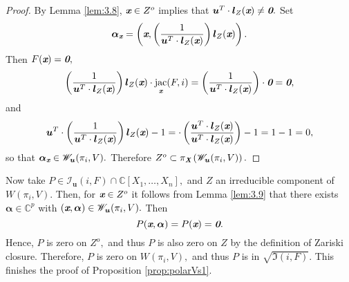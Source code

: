 \documentclass[a4paper]{article}
\def\bz{\textit{\textbf{0}}}
\def\Xb{\textit{\textbf{X}}}
\def\ub{{\bm u}}
\def\lb{{\bm l}}
\def\ax{\bm \alpha_{\xb}}
\def\xb{\textit{\textbf{x}}}
\DeclareMathOperator{\jac}{jac}
\def\C{\mathbb{C}}
\def\Wi{W(\pi_i,V)}
\def\Iir{\sqrt{\mathfrak{I}(i,F)}}
\def\ji{\jac_{\xb}(F,i)}
\def\Iil{\mathscr{I}_{\ub}(i,F)}
\def\Wil{\mathscr{W}_{\ub}(\pi_i,V)}
\begin{document}
%
\begin{proof}
By Lemma \ref{lem:3.8}, $\xb \in Z^o$ implies that $\ub^T \cdot \lb_{Z}(\xb) \not = \bz.$ Set
\[
\bm \alpha_{\xb} = \left(\xb,\left(\frac{1}{\ub^T\cdot \lb_{Z}(\xb)}\right)\lb_{Z}(\xb)\right). 
\]
Then $F(\xb)=\bz,$
\begin{align*}
    \left(\frac{1}{\ub^T\cdot \lb_{Z}(\xb)}\right)\lb_{Z}(\xb)\cdot \ji = \left(\frac{1}{\ub^T\cdot \lb_{Z}(\xb)}\right)\cdot \bz = \bz,
\end{align*}
and
\[
\ub^T\cdot\left(\frac{1}{\ub^T\cdot \lb_{Z}(\xb)}\right)\lb_{Z}(\xb)-1 =
    \cdot\left(\frac{\ub^T\cdot\lb_{Z}(\xb)}{\ub^T\cdot \lb_{Z}(\xb)}\right)-1=1-1=0,
\]
so that $\ax \in \Wil.$ Therefore $Z^o \subset \pi_{\Xb}\left(\Wil\right).$
%
\end{proof}
%
%
%
\noindent 
Now take $P \in \Iil\cap \C[X_1,\hdots,X_n],$ and $Z$ an irreducible component of $\Wi.$ Then, for $\xb \in Z^o$ it follows from Lemma \ref{lem:3.9} that there exists $\bm \alpha \in \C^p$ with $(\xb, \bm \alpha) \in \Wil.$ Then 
\[
P(\xb, \bm \alpha) = P(\xb) = \bz.
\]
Hence, $P$ is zero on $Z^o,$ and thus $P$ is also zero on $Z$ by the definition of Zariski closure. Therefore, $P$ is zero on $\Wi,$ and thus $P$ is in $\Iir.$ This finishes the proof of Proposition \ref{prop:polarVs1}. 

\noindent
\end{document}
